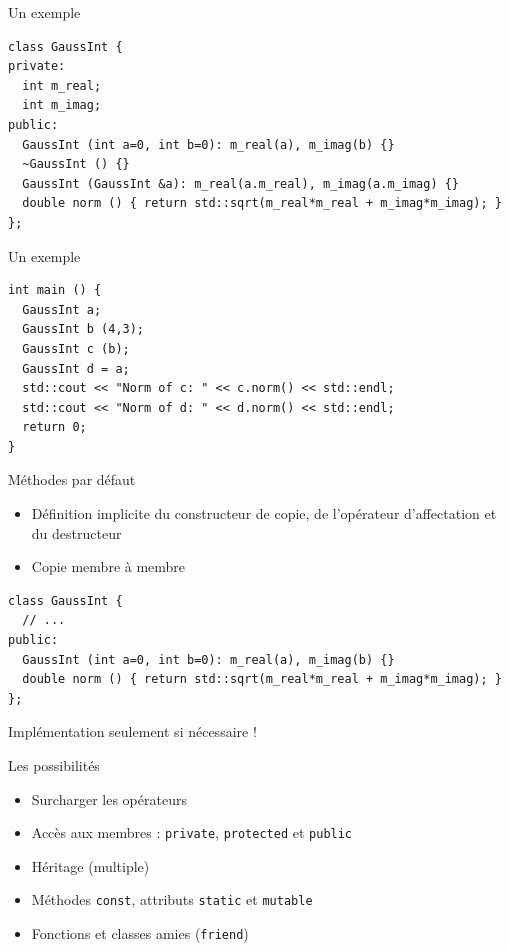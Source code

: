 \begin{frame}[fragile]{Un exemple}
  \begin{lstlisting}
class GaussInt {
private:
  int m_real;
  int m_imag;
public:
  GaussInt (int a=0, int b=0): m_real(a), m_imag(b) {}
  ~GaussInt () {}
  GaussInt (GaussInt &a): m_real(a.m_real), m_imag(a.m_imag) {}
  double norm () { return std::sqrt(m_real*m_real + m_imag*m_imag); }
};
  \end{lstlisting}
\end{frame}

\begin{frame}[fragile]{Un exemple}
  \begin{lstlisting}
int main () {
  GaussInt a;
  GaussInt b (4,3);
  GaussInt c (b);
  GaussInt d = a;
  std::cout << "Norm of c: " << c.norm() << std::endl;
  std::cout << "Norm of d: " << d.norm() << std::endl;
  return 0;
}
  \end{lstlisting}
\end{frame}

\begin{frame}[fragile]{Méthodes par défaut}
  \begin{itemize}
  \item Définition implicite du constructeur de copie, de l'opérateur d'affectation et du destructeur
  \item Copie membre à membre
  \end{itemize}

  \begin{lstlisting}
class GaussInt {
  // ...
public:
  GaussInt (int a=0, int b=0): m_real(a), m_imag(b) {}
  double norm () { return std::sqrt(m_real*m_real + m_imag*m_imag); }
};
  \end{lstlisting}
  
  Implémentation seulement si nécessaire !
\end{frame}

\begin{frame}{Les possibilités}
  \begin{itemize}
  \item Surcharger les opérateurs
  \item Accès aux membres : \texttt{private}, \texttt{protected} et \texttt{public}
  \item Héritage (multiple)
  \item Méthodes \texttt{const}, attributs \texttt{static} et \texttt{mutable}
  \item Fonctions et classes amies (\texttt{friend})
  \end{itemize}
\end{frame}

